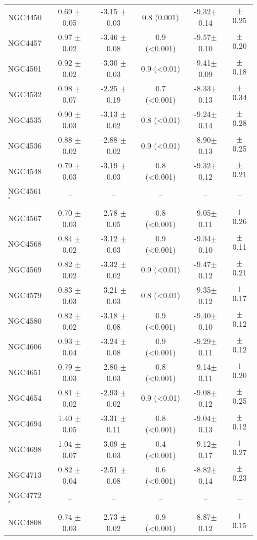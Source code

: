 \documentclass[longauth]{aa}
\begin{document}
\begin{table*}
\begin{tabular}{lccccc}
NGC4450 & 0.69 $\pm$ 0.05 & -3.15 $\pm$ 0.03 & 0.8 (0.001) & -9.32$\pm$0.14 & $\pm$0.25\\ 
NGC4457 & 0.97 $\pm$ 0.02 & -3.46 $\pm$ 0.08 & 0.9 (<0.001) & -9.57$\pm$0.10 & $\pm$0.20\\ 
NGC4501 & 0.92 $\pm$ 0.02 & -3.30 $\pm$ 0.03 & 0.9 (<0.01) & -9.41$\pm$0.09 & $\pm$0.18\\ 
NGC4532 & 0.98 $\pm$ 0.07 & -2.25 $\pm$ 0.19 & 0.7 (<0.001) & -8.33$\pm$0.13 & $\pm$0.34\\ 
NGC4535 & 0.90 $\pm$ 0.03 & -3.13 $\pm$ 0.02 & 0.8 (<0.01) & -9.24$\pm$0.14 & $\pm$0.28\\ 
NGC4536 & 0.88 $\pm$ 0.02 & -2.88 $\pm$ 0.02 & 0.9 (<0.01) & -8.90$\pm$0.13 & $\pm$0.25\\ 
NGC4548 & 0.79 $\pm$ 0.03 & -3.19 $\pm$ 0.03 & 0.8 (<0.001) & -9.32$\pm$0.12 & $\pm$0.21\\ 
NGC4561$^{*}$ & -- & -- & -- & -- & --\\ 
NGC4567 & 0.70 $\pm$ 0.03 & -2.78 $\pm$ 0.05 & 0.8 (<0.001) & -9.05$\pm$0.11 & $\pm$0.26\\ 
NGC4568 & 0.84 $\pm$ 0.02 & -3.12 $\pm$ 0.03 & 0.9 (<0.001) & -9.34$\pm$0.10 & $\pm$0.11\\ 
NGC4569 & 0.82 $\pm$ 0.02 & -3.32 $\pm$ 0.02 & 0.9 (<0.01) & -9.47$\pm$0.12 & $\pm$0.21\\ 
NGC4579 & 0.83 $\pm$ 0.03 & -3.21 $\pm$ 0.03 & 0.8 (<0.01) & -9.35$\pm$0.12 & $\pm$0.17\\ 
NGC4580 & 0.82 $\pm$ 0.02 & -3.18 $\pm$ 0.08 & 0.9 (<0.001) & -9.40$\pm$0.10 & $\pm$0.12\\ 
NGC4606 & 0.93 $\pm$ 0.04 & -3.24 $\pm$ 0.08 & 0.9 (<0.001) & -9.29$\pm$0.11 & $\pm$0.12\\ 
NGC4651 & 0.79 $\pm$ 0.03 & -2.80 $\pm$ 0.03 & 0.8 (<0.001) & -9.14$\pm$0.11 & $\pm$0.20\\
NGC4654 & 0.81 $\pm$ 0.02 & -2.93 $\pm$ 0.02 & 0.9 (<0.01) & -9.08$\pm$0.12 & $\pm$0.25\\ 
NGC4694 & 1.40 $\pm$ 0.05 & -3.31 $\pm$ 0.11 & 0.8 (<0.001) & -9.04$\pm$0.13 & $\pm$0.12\\ 
NGC4698 & 1.04 $\pm$ 0.07 & -3.09 $\pm$ 0.03 & 0.4 (<0.001) & -9.12$\pm$0.17 & $\pm$0.27\\ 
NGC4713 & 0.82 $\pm$ 0.04 & -2.51 $\pm$ 0.08 & 0.6 (<0.001) & -8.82$\pm$0.14 & $\pm$0.23\\ 
NGC4772$^{*}$ & -- & -- & -- & -- & --\\ 
NGC4808 & 0.74 $\pm$ 0.03 & -2.73 $\pm$ 0.02 & 0.9 (<0.001) & -8.87$\pm$0.12 & $\pm$0.15\\

\end{tabular}
\end{table*}
\end{document}
